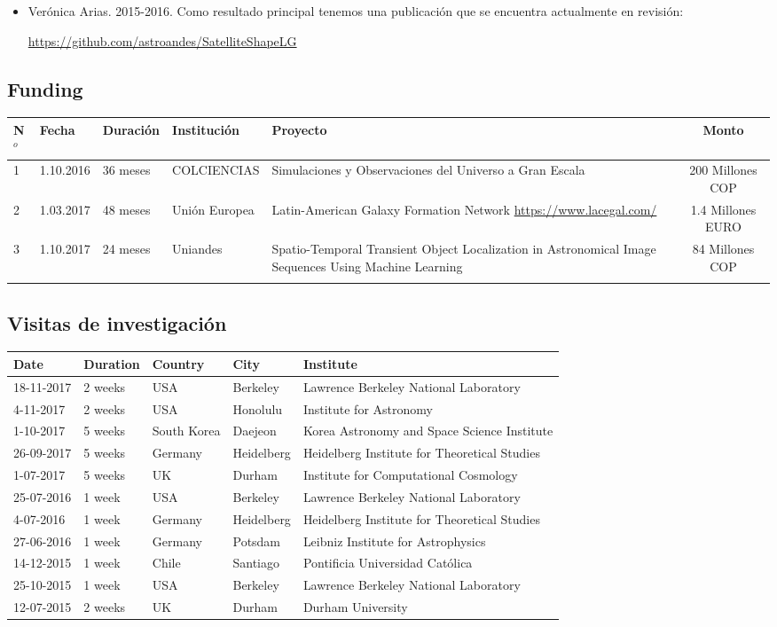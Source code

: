 \documentclass{article}
\begin{document}
\begin{itemize}
\item Ver\'onica Arias. 2015-2016. Como resultado principal tenemos
  una publicaci\'on que se encuentra actualmente en revisi\'on:

\url{https://github.com/astroandes/SatelliteShapeLG}

\end{itemize}

\subsection{Funding}
\begin{tabular}{l l l p{2.4cm} p{4.0cm} c}\hline
N$^{o}$ & Fecha & Duraci\'on & Instituci\'on & Proyecto & Monto \\\hline
1 & 1.10.2016 & 36 meses & COLCIENCIAS & Simulaciones y Observaciones del Universo a Gran Escala & 200 Millones COP\\\hline
2 & 1.03.2017 & 48 meses & Uni\'on Europea & Latin-American Galaxy Formation Network \url{https://www.lacegal.com/} & 1.4 Millones EURO \\\hline
3 & 1.10.2017 & 24 meses & Uniandes & 
Spatio-Temporal Transient Object Localization in Astronomical Image
Sequences Using Machine Learning & 84 Millones COP \\
\\\hline 
\end{tabular}

\subsection{Visitas de investigaci\'on}
\begin{tabular}{p{1.7cm} p{1.3cm} p{2.0cm} p{1.5cm} p{7.0cm}}\hline
Date & Duration & Country & City & Institute\\\hline
18-11-2017 & 2 weeks & USA & Berkeley & Lawrence Berkeley National Laboratory\\
4-11-2017 & 2 weeks & USA & Honolulu & Institute for Astronomy\\
1-10-2017 & 5 weeks & South Korea & Daejeon & Korea Astronomy and Space Science Institute \\
26-09-2017 & 5 weeks & Germany & Heidelberg & Heidelberg Institute for Theoretical Studies\\
1-07-2017 & 5 weeks & UK & Durham & Institute for Computational Cosmology\\
25-07-2016 & 1 week & USA & Berkeley & Lawrence Berkeley National Laboratory\\
4-07-2016 & 1 week & Germany & Heidelberg & Heidelberg Institute for Theoretical Studies \\
27-06-2016 & 1 week & Germany & Potsdam & Leibniz Institute for Astrophysics \\
14-12-2015 & 1 week & Chile & Santiago & Pontificia Universidad Cat\'olica\\
25-10-2015 & 1 week & USA & Berkeley & Lawrence Berkeley National Laboratory\\
12-07-2015 & 2 weeks & UK & Durham & Durham University\\\hline
\end{tabular}
\end{document}
